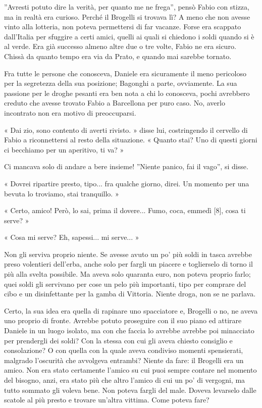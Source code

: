 ''Avresti potuto dire la verità, per quanto me ne frega'', pensò Fabio con stizza, ma in realtà era curioso. Perché il Brogelli si trovava lì? A meno che non avesse vinto alla lotteria, non poteva permettersi di far vacanze. Forse era scappato dall'Italia per sfuggire a certi amici, quelli ai quali si chiedono i soldi quando si è al verde. Era già successo almeno altre due o tre volte, Fabio ne era sicuro. Chissà da quanto tempo era via da Prato, e quando mai sarebbe tornato.

Fra tutte le persone che conosceva, Daniele era sicuramente il meno pericoloso per la segretezza della sua posizione; Bagonghi a parte, ovviamente. La sua passione per le droghe pesanti era ben nota a chi lo conosceva, pochi avrebbero creduto che avesse trovato Fabio a Barcellona per puro caso. No, averlo incontrato non era motivo di preoccuparsi.

« Dai zio, sono contento di averti rivisto. » disse lui, costringendo il cervello di Fabio a riconnettersi al resto della situazione. « Quanto stai? Uno di questi giorni ci becchiamo per un aperitivo, ti va? »

Ci mancava solo di andare a bere insieme! ''Niente panico, fai il vago'', si disse.

« Dovrei ripartire presto, tipo... fra qualche giorno, direi. Un momento per una bevuta lo troviamo, stai tranquillo. »

« Certo, amico! Però, lo sai, prima il dovere... Fumo, coca, emmedì [8], cosa ti serve? »

« Cosa mi serve? Eh, sapessi... mi serve... »

Non gli serviva proprio niente. Se avesse avuto un po' più soldi in tasca avrebbe preso volentieri dell'erba, anche solo per fargli un piacere e toglierselo di torno il più alla svelta possibile. Ma aveva solo quaranta euro, non poteva proprio farlo; quei soldi gli servivano per cose un pelo più importanti, tipo per comprare del cibo e un disinfettante per la gamba di Vittoria. Niente droga, non se ne parlava.

Certo, la sua idea era quella di rapinare uno spacciatore e, Brogelli o no, ne aveva uno proprio di fronte. Avrebbe potuto proseguire con il suo piano ed attirare Daniele in un luogo isolato, ma con che faccia lo avrebbe avrebbe poi minacciato per prendergli dei soldi? Con la stessa con cui gli aveva chiesto consiglio e consolazione? O con quella con la quale aveva condiviso momenti spensierati, malgrado l'oscurità che avvolgeva entrambi? Niente da fare: il Brogelli era un amico. Non era stato certamente l'amico su cui puoi sempre contare nel momento del bisogno, anzi, era stato più che altro l'amico di cui un po' di vergogni, ma tutto sommato gli voleva bene. Non poteva fargli del male. Doveva levarselo dalle scatole al più presto e trovare un'altra vittima. Come poteva fare?


